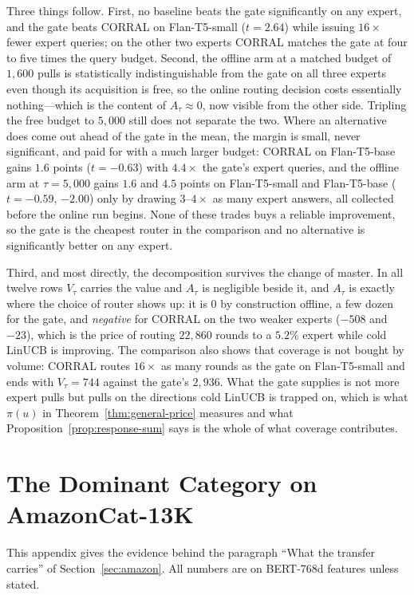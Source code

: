 \documentclass{article}
\theoremstyle{definition}
\theoremstyle{remark}
\theoremstyle{remark}
\begin{document}
Three things follow. First, no baseline beats the gate significantly on any
expert, and the gate beats CORRAL on Flan-T5-small ($t=2.64$) while issuing
$16\times$ fewer expert queries; on the other two experts CORRAL matches the
gate at four to five times the query budget. Second, the offline arm at a
matched budget of $1{,}600$ pulls is statistically indistinguishable from the
gate on all three experts even though its acquisition is free, so the online
routing decision costs essentially nothing---which is the content of
$A_\tau\approx0$, now visible from the other side. Tripling the free budget to
$5{,}000$ still does not separate the two. Where an alternative does come out
ahead of the gate in the mean, the margin is small, never significant, and
paid for with a much larger budget: CORRAL on Flan-T5-base gains $1.6$
points ($t=-0.63$) with $4.4\times$ the gate's expert queries, and the
offline arm at $\tau=5{,}000$ gains $1.6$ and $4.5$ points on Flan-T5-small
and Flan-T5-base ($t=-0.59$, $-2.00$) only by drawing $3$--$4\times$ as many
expert answers, all collected before the online run begins. None of these
trades buys a reliable improvement, so the gate is the cheapest router in
the comparison and no alternative is significantly better on any expert.

Third, and most directly, the decomposition survives the change of master. In
all twelve rows $V_\tau$ carries the value and $A_\tau$ is negligible beside
it, and $A_\tau$ is exactly where the choice of router shows up: it is $0$ by
construction offline, a few dozen for the gate, and \emph{negative} for CORRAL
on the two weaker experts ($-508$ and $-23$), which is the price of routing
$22{,}860$ rounds to a $5.2\%$ expert while cold LinUCB is improving. The
comparison also shows that coverage is not bought by volume: CORRAL routes
$16\times$ as many rounds as the gate on Flan-T5-small and ends with
$V_\tau=744$ against the gate's $2{,}936$. What the gate supplies is not more
expert pulls but pulls on the directions cold LinUCB is trapped on, which is
what $\pi(u)$ in Theorem~\ref{thm:general-price} measures and what
Proposition~\ref{prop:response-sum} says is the whole of what coverage contributes.

\section{The Dominant Category on AmazonCat-13K}
\label{app:dominant}

This appendix gives the evidence behind the paragraph ``What the transfer
carries'' of Section~\ref{sec:amazon}. All numbers are on BERT-768d features
unless stated.
\end{document}
